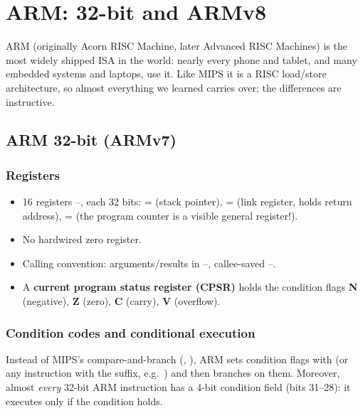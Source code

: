 \chapter{ARM: 32-bit and ARMv8}

ARM (originally Acorn RISC Machine, later Advanced RISC Machines) is the
most widely shipped ISA in the world: nearly every phone and tablet, and
many embedded systems and laptops, use it. Like MIPS it is a RISC
load/store architecture, so almost everything we learned carries over; the
differences are instructive.

\section{ARM 32-bit (ARMv7)}

\subsection{Registers}

\begin{itemize}
  \item 16 registers --, each 32 bits:
     =  (stack pointer),  =  (link
    register, holds return address),  = 
    (the program counter is a visible general register!).
  \item No hardwired zero register.
  \item Calling convention: arguments/results in --,
    callee-saved --.
  \item A \textbf{current program status register (CPSR)} holds the
    condition flags \textbf{N} (negative), \textbf{Z} (zero), \textbf{C}
    (carry), \textbf{V} (overflow).
\end{itemize}

\subsection{Condition codes and conditional execution}

Instead of MIPS's compare-and-branch (, ), ARM sets
condition flags with  (or any instruction with the 
suffix, e.g.\ ) and then branches on them. Moreover, almost
\emph{every} 32-bit ARM instruction has a 4-bit condition field
(bits 31--28): it executes only if the condition holds.

